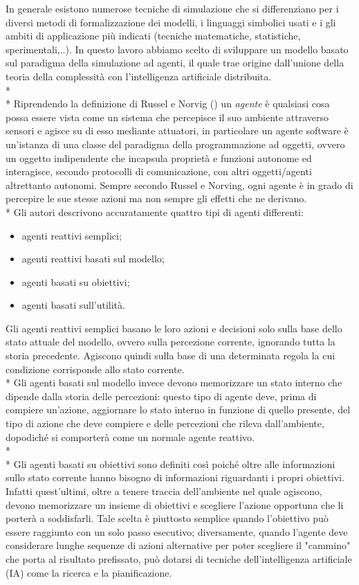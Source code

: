 In generale esistono numerose tecniche di simulazione che si differenziano per i diversi metodi di formalizzazione dei modelli, i linguaggi simbolici usati e i gli ambiti di applicazione più indicati (tecniche matematiche, statistiche, sperimentali,..). In questo lavoro abbiamo scelto di sviluppare un modello basato sul paradigma della simulazione ad agenti, il quale trae origine dall'unione della teoria della complessità con l'intelligenza artificiale distribuita.\\*\\*
Riprendendo la definizione di Russel e Norvig (\cite{Russell}) un \emph{agente} è qualsiasi cosa possa essere vista come un sistema che percepisce il suo ambiente attraverso sensori e agisce su di esso mediante attuatori, in particolare un agente software è un'istanza di una classe del paradigma della programmazione ad oggetti, ovvero un oggetto indipendente  che incapsula proprietà e funzioni autonome ed interagisce, secondo protocolli di comunicazione, con altri oggetti/agenti altrettanto autonomi. Sempre secondo Russel e Norving, ogni agente è in grado di percepire le sue stesse azioni ma non sempre gli effetti che ne derivano.
\\*
Gli autori descrivono accuratamente quattro tipi di agenti differenti:
\begin{itemize}
\item agenti reattivi semplici;
\item agenti reattivi basati sul modello;
\item agenti basati su obiettivi;
\item agenti basati sull'utilità.
\end{itemize}
Gli agenti reattivi semplici basano le loro azioni e decisioni solo sulla base dello stato attuale del modello, ovvero sulla percezione corrente, ignorando tutta la storia precedente. Agiscono quindi sulla base di una determinata regola la cui condizione corrisponde allo stato corrente.
\\*
Gli agenti basati sul modello invece devono memorizzare un stato interno che dipende dalla storia delle percezioni: questo tipo di agente deve, prima di compiere un'azione, aggiornare lo stato interno in funzione di quello presente, del tipo di azione che deve compiere e delle percezioni che rileva dall'ambiente, dopodiché si comporterà come un normale agente reattivo.\\* \\*
Gli agenti basati su obiettivi sono definiti così poiché oltre alle informazioni sullo stato corrente hanno bisogno di informazioni riguardanti i propri obiettivi. Infatti quest'ultimi, oltre a tenere traccia dell'ambiente nel quale agiscono, devono memorizzare un insieme di obiettivi e scegliere l'azione opportuna che li porterà a soddisfarli. Tale scelta è piuttosto semplice quando l'obiettivo può essere raggiunto con un solo passo esecutivo; diversamente, quando l'agente deve considerare lunghe sequenze di azioni alternative per poter scegliere il "cammino" che porta al risultato prefissato, può dotarsi di tecniche dell'intelligenza artificiale (IA) come la ricerca e la pianificazione.

